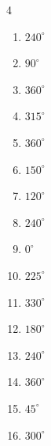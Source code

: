 \begin{multicols}{4}
\begin{enumerate}
  \item $\displaystyle 240^{\circ}$

  \item $\displaystyle 90^{\circ}$

\columnbreak %

  \item $\displaystyle 360^{\circ}$
        \phantom{$\displaystyle =2\pi$}

  \item $\displaystyle 315^{\circ}$

  \item $\displaystyle 360^{\circ}$
        \phantom{$\displaystyle =2\pi$}

  \item $\displaystyle 150^{\circ}$

  \item $\displaystyle 120^{\circ}$

  \item $\displaystyle 240^{\circ}$

  \item $\displaystyle 0^{\circ}$
        \phantom{$\displaystyle =0$}

  \item $\displaystyle 225^{\circ}$

  \item $\displaystyle 330^{\circ}$

  \item $\displaystyle 180^{\circ}$
        \phantom{$\displaystyle =\pi$}

  \item $\displaystyle 240^{\circ}$

  \item $\displaystyle 360^{\circ}$
        \phantom{$\displaystyle =2\pi$}

  \item $\displaystyle 45^{\circ}$

  \item $\displaystyle 300^{\circ}$


\end{enumerate}
\end{multicols}
